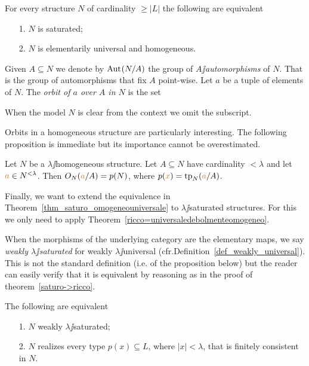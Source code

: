\documentclass[creche.tex]{subfiles}
\begin{document}
\begin{theorem}\label{thm_saturo_omogeneouniversale}
For every structure $N$ of cardinality $\ge|L|$ the following are equivalent\nobreak
\begin{itemize}
\item[1.] $N$ is saturated;
\item[2.] $N$ is elementarily universal and homogeneous.\QED
\end{itemize}
\end{theorem}

Given $A\subseteq N$ we denote by \emph{$\textrm{Aut\kern.15ex}(N/A)$\/} the group of \emph{$A\jj$automorphisms\/} of $N$. That is the group of automorphisms that fix $A$ point-wise. Let $a$ be a tuple of elements of $N$. The \emph{orbit of $a$ over $A$ in $N$} is the set


When the model $N$ is clear from the context we omit the subscript.

Orbits in a homogeneous structure are particularly interesting. The following proposition is immediate but its importance cannot be overestimated.

\begin{proposition}\label{omogeneitaorbitetipi}
Let $N$ be a $\lambda\jj$homogeneous structure. Let $A\subseteq N$ have cardinality $<\lambda$ and let ${\color{brown} a}\in N^{<\lambda}$. Then $O_N({\color{brown} a}/A)=p(N)$, where $p({\color{brown} x})={\rm tp}_N({\color{brown} a}/A)$.\QED
\end{proposition}


Finally, we want to extend the equivalence in Theorem~\ref{thm_saturo_omogeneouniversale} to $\lambda\jj$saturated structures. For this we only need to apply Theorem~\ref{ricco=universaledebolmenteomogeneo}. 

When the morphisms of the underlying category are the elementary maps, we say \emph{weakly $\lambda\jj$saturated} for weakly $\lambda\jj$universal (cfr.\@ Definition~\ref{def_weakly_universal}). This is not the standard definition (i.e.\@ {} of the proposition below) but the reader can easily verify that it is equivalent by reasoning as in the proof of theorem~\ref{saturo->ricco}.

\begin{proposition}\label{prop_w_saturation}
The following are equivalent
\begin{itemize}
\item[1.] $N$ weakly $\lambda\jj$saturated;
\item[2.] $N$ realizes every type $p(x)\subseteq L$, where $|x|<\lambda$, that is finitely consistent in $N$.\QED
\end{itemize}
\end{proposition}
\end{document}
